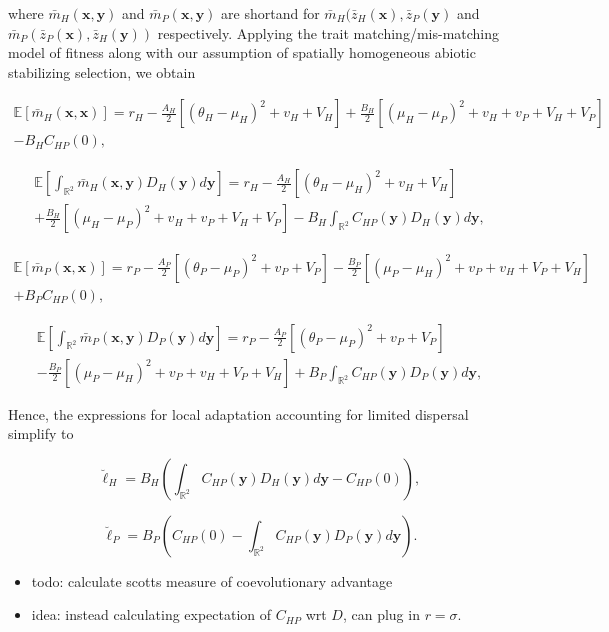 \documentclass{article}
\begin{document}
where \(\bar m_H(\pmb x,\pmb y)\) and \(\bar m_P(\pmb x,\pmb y)\) are
shortand for \(\bar m_H(\bar z_H(\pmb x),\bar z_P(\pmb y)\) and
\(\bar m_P(\bar z_P(\pmb x),\bar z_H(\pmb y))\) respectively. Applying
the trait matching/mis-matching model of fitness along with our
assumption of spatially homogeneous abiotic stabilizing selection, we
obtain

\begin{multline}
  \mathbb E[\bar m_H(\pmb x,\pmb x)]=
  r_H-\frac{A_H}{2}[(\theta_H-\mu_H)^2+v_H+V_H]
  +\frac{B_H}{2}[(\mu_H-\mu_P)^2+v_H+v_P+V_H+V_P] \\
  -B_HC_{HP}(0),
\end{multline}

\begin{multline}
  \mathbb E\left[\int_{\mathbb R^2}\bar m_H(\pmb x,\pmb y)
  D_H(\pmb y)d\pmb y\right]= 
  r_H-\frac{A_H}{2}[(\theta_H-\mu_H)^2+v_H+V_H] \\
  +\frac{B_H}{2}[(\mu_H-\mu_P)^2+v_H+v_P+V_H+V_P]
  -B_H\int_{\mathbb R^2}C_{HP}(\pmb y)D_H(\pmb y)d\pmb y,
\end{multline}

\begin{multline}
  \mathbb E[\bar m_P(\pmb x,\pmb x)]=
  r_P-\frac{A_P}{2}[(\theta_P-\mu_P)^2+v_P+V_P]
  -\frac{B_P}{2}[(\mu_P-\mu_H)^2+v_P+v_H+V_P+V_H] \\
  +B_P C_{HP}(0),
\end{multline}

\begin{multline}
  \mathbb E\left[\int_{\mathbb R^2}\bar m_P(\pmb x,\pmb y)
  D_P(\pmb y)d\pmb y\right]= 
  r_P-\frac{A_P}{2}[(\theta_P-\mu_P)^2+v_P+V_P] \\
  -\frac{B_P}{2}[(\mu_P-\mu_H)^2+v_P+v_H+V_P+V_H]
  +B_P\int_{\mathbb R^2}C_{HP}(\pmb y)D_P(\pmb y)d\pmb y,
\end{multline}

Hence, the expressions for local adaptation accounting for limited
dispersal simplify to

\[\breve\ell_H=B_H\left(\int_{\mathbb R^2}C_{HP}(\pmb y)D_H(\pmb y)d\pmb y-C_{HP}(0)\right),\]

\[\breve\ell_P=B_P\left(C_{HP}(0)-\int_{\mathbb R^2}C_{HP}(\pmb y)D_P(\pmb y)d\pmb y\right).\]

\begin{itemize}
\item
  todo: calculate scotts measure of coevolutionary advantage
\item
  idea: instead calculating expectation of \(C_{HP}\) wrt \(D\), can
  plug in \(r=\sigma\).
\end{itemize}
\end{document}
